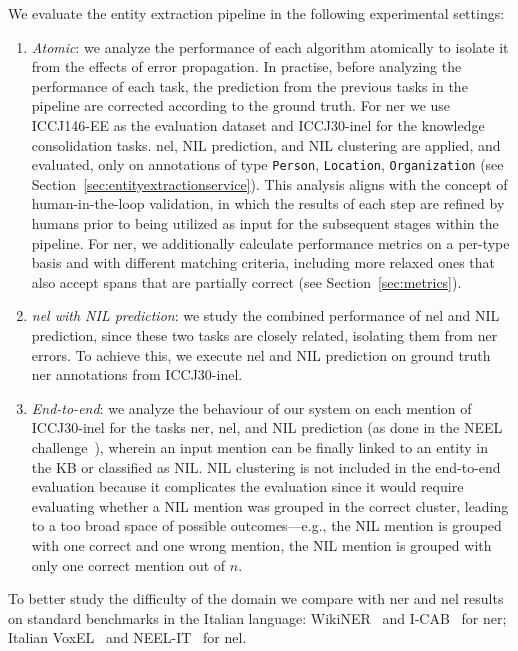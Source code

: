 We evaluate the entity extraction pipeline in the following experimental settings:
\begin{enumerate}
    \item \textit{Atomic}: we analyze the performance of each algorithm atomically to isolate it from the effects of error propagation. In practise, before analyzing the performance of each task, the prediction from the previous tasks in the pipeline are corrected according to the ground truth. For \ac{ner} we use ICCJ146-EE as the evaluation dataset and ICCJ30-\ac{inel} for the knowledge consolidation tasks. \ac{nel}, NIL prediction, and NIL clustering are applied, and evaluated, only on annotations of type \texttt{Person}, \texttt{Location}, \texttt{Organization} (see Section~\ref{sec:entityextractionservice}). This analysis aligns with the concept of human-in-the-loop validation, in which the results of each step are refined by humans prior to being utilized as input for the subsequent stages within the pipeline. For \ac{ner}, we additionally calculate performance metrics on a per-type basis and with different matching criteria, including more relaxed ones that also accept spans that are partially correct (see Section~\ref{sec:metrics}).  
    \item \textit{\ac{nel} with NIL prediction}: we study the combined performance of \ac{nel} and NIL prediction, since these two tasks are closely related, isolating them from \ac{ner} errors. To achieve this, we execute \ac{nel} and NIL prediction on ground truth \ac{ner} annotations from ICCJ30-\ac{inel}.
    \item \textit{End-to-end}: we analyze the behaviour of our system on each mention of ICCJ30-\ac{inel} for the tasks \ac{ner}, \ac{nel}, and NIL prediction (as done in the NEEL challenge~\cite{basile2016neelit}), wherein an input mention can be finally linked to an entity in the KB or classified as NIL. NIL clustering is not included in the end-to-end evaluation because it complicates the evaluation since it would require evaluating whether a NIL mention was grouped in the correct cluster, leading to a too broad space of possible outcomes---e.g., the NIL mention is grouped with one correct and one wrong mention, the NIL mention is grouped with only one correct mention out of $n$.
\end{enumerate}
To better study the difficulty of the domain we compare with \ac{ner} and \ac{nel} results on standard benchmarks in the Italian language: WikiNER~\cite{NOTHMAN2013151} and I-CAB~\cite{magnini-etal-2006-cab} for \ac{ner}; Italian VoxEL~\cite{rosales2018voxel} and NEEL-IT~\cite{basile2016neelit} for \ac{nel}.

